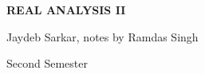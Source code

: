 \documentclass[15pt,a4paper]{book}
\theoremstyle{definition}
\begin{document}
\pagestyle{empty}

\begin{titlepage}
    \begin{center}
    \vspace*{\fill}
    {\Huge \textbf{\MakeUppercase{Real Analysis II}}\par}

    \vspace{0.5cm} %
    {\Large Jaydeb Sarkar, notes by Ramdas Singh\par}

    \vspace{0.5cm} %
    {\large Second Semester\par}
    \vspace*{\fill}
    \end{center}
\end{titlepage}

\clearpage

\end{document}
